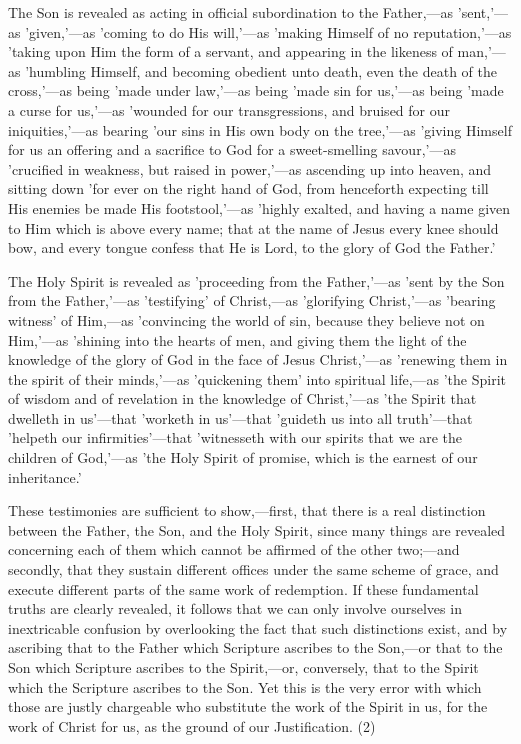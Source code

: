 \documentclass[
]{book}
\begin{document}
The Son is revealed as acting in official subordination to the Father,---as 'sent,'---as 'given,'---as 'coming to do His will,'---as 'making Himself of no reputation,'---as 'taking upon Him the form of a servant, and appearing in the likeness of man,'---as 'humbling Himself, and becoming obedient unto death, even the death of the cross,'---as being 'made under law,'---as being 'made sin for us,'---as being 'made a curse for us,'---as 'wounded for our transgressions, and bruised for our iniquities,'---as bearing 'our sins in His own body on the tree,'---as 'giving Himself for us an offering and a sacrifice to God for a sweet-smelling savour,'---as 'crucified in weakness, but raised in power,'---as ascending up into heaven, and sitting down 'for ever on the right hand of God, from henceforth expecting till His enemies be made His footstool,'---as 'highly exalted, and having a name given to Him which is above every name; that at the name of Jesus every knee should bow, and every tongue confess that He is Lord, to the glory of God the Father.'

The Holy Spirit is revealed as 'proceeding from the Father,'---as 'sent by the Son from the Father,'---as 'testifying' of Christ,---as 'glorifying Christ,'---as 'bearing witness' of Him,---as 'convincing the world of sin, because they believe not on Him,'---as 'shining into the hearts of men, and giving them the light of the knowledge of the glory of God in the face of Jesus Christ,'---as 'renewing them in the spirit of their minds,'---as 'quickening them' into spiritual life,---as 'the Spirit of wisdom and of revelation in the knowledge of Christ,'---as 'the Spirit that dwelleth in us'---that 'worketh in us'---that 'guideth us into all truth'---that 'helpeth our infirmities'---that 'witnesseth with our spirits that we are the children of God,'---as 'the Holy Spirit of promise, which is the earnest of our inheritance.'

These testimonies are sufficient to show,---first, that there is a real distinction between the Father, the Son, and the Holy Spirit, since many things are revealed concerning each of them which cannot be affirmed of the other two;---and secondly, that they sustain different offices under the same scheme of grace, and execute different parts of the same work of redemption. If these fundamental truths are clearly revealed, it follows that we can only involve ourselves in inextricable confusion by overlooking the fact that such distinctions exist, and by ascribing that to the Father which Scripture ascribes to the Son,---or that to the Son which Scripture ascribes to the Spirit,---or, conversely, that to the Spirit which the Scripture ascribes to the Son. Yet this is the very error with which those are justly chargeable who substitute the work of the Spirit in us, for the work of Christ for us, as the ground of our Justification. (2)
\end{document}
